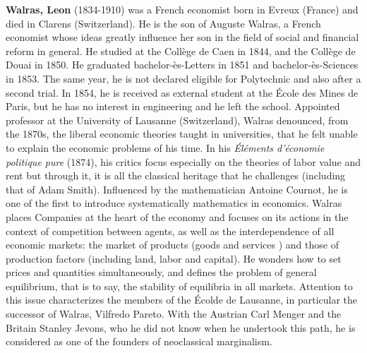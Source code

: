 \textbf{Walras, Leon} (1834-1910) was a French economist born in Evreux (France) and died in Clarens (Switzerland). He is the son of Auguste Walras, a French economist whose ideas greatly influence her son in the field of social and financial reform in general. He studied at the Collège de Caen in 1844, and the Collège de Douai in 1850. He graduated bachelor-ès-Letters in 1851 and bachelor-ès-Sciences in 1853. The same year, he is not declared eligible for Polytechnic and also after a second trial. In 1854, he is received as external student at the École des Mines de Paris, but he has no interest in engineering and he left the school. Appointed professor at the University of Lausanne (Switzerland), Walras denounced, from the 1870s, the liberal economic theories taught in universities, that he felt unable to explain the economic problems of his time. In his \textit{Éléments d'économie politique pure} (1874), his critics focus especially on the theories of labor value and rent but through it, it is all the classical heritage that he challenges (including that of Adam Smith). Influenced by the mathematician Antoine Cournot, he is one of the first to introduce systematically mathematics in economics. Walras places Companies at the heart of the economy and focuses on its actions in the context of competition between agents, as well as the interdependence of all economic markets: the market of products (goods and services ) and those of production factors (including land, labor and capital). He wonders how to set prices and quantities simultaneously, and defines the problem of general equilibrium, that is to say, the stability of equilibria in all markets. Attention to this issue characterizes the members of the Écolde de Lausanne, in particular the successor of Walras, Vilfredo Pareto. With the Austrian Carl Menger and the Britain Stanley Jevons, who he did not know when he undertook this path, he is considered as one of the founders of neoclassical marginalism.

